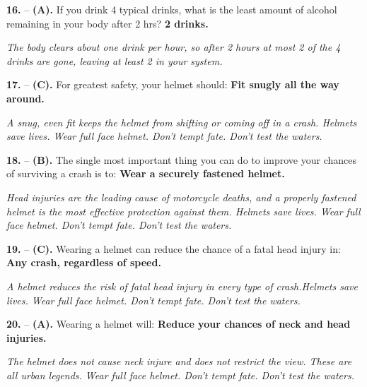 \begin{minipage}{\linewidth}
\noindent\textbf{16.}  -- \textbf {(A).} If you drink 4 typical drinks, what is the least amount of alcohol remaining in your body after 2 hrs?  \textbf {2 drinks.} \par \textit {The body clears about one drink per hour, so after 2 hours at most 2 of the 4 drinks are gone, leaving at least 2 in your system.} \\
\end{minipage}

\begin{minipage}{\linewidth}
\noindent\textbf{17.}  -- \textbf {(C).} For greatest safety, your helmet should:  \textbf {Fit snugly all the way around.} \par \textit {A snug, even fit keeps the helmet from shifting or coming off in a crash. Helmets save lives. Wear full face helmet. Don’t tempt fate. Don't test the waters.} \\
\end{minipage}

\begin{minipage}{\linewidth}
\noindent\textbf{18.}  -- \textbf {(B).} The single most important thing you can do to improve your chances of surviving a crash is to:  \textbf {Wear a securely fastened helmet.} \par \textit {Head injuries are the leading cause of motorcycle deaths, and a properly fastened helmet is the most effective protection against them. Helmets save lives. Wear full face helmet. Don’t tempt fate. Don't test the waters.} \\
\end{minipage}

\begin{minipage}{\linewidth}
\noindent\textbf{19.}  -- \textbf {(C).} Wearing a helmet can reduce the chance of a fatal head injury in:  \textbf {Any crash, regardless of speed.} \par \textit {A helmet reduces the risk of fatal head injury in every type of crash.Helmets save lives. Wear full face helmet. Don’t tempt fate. Don't test the waters.} \\
\end{minipage}

\begin{minipage}{\linewidth}
\noindent\textbf{20.}  -- \textbf {(A).} Wearing a helmet will:  \textbf {Reduce your chances of neck and head injuries.} \par \textit {The helmet does not cause neck injure and does not restrict the view. These are all urban legends. Wear full face helmet. Don’t tempt fate. Don't test the waters.} \\
\end{minipage}

